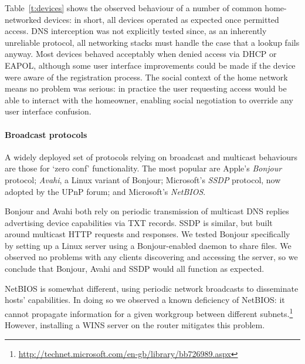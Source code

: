 Table~\ref{t:devices} shows the observed behaviour of a number of common
home-networked devices: in short, all devices operated as expected once
permitted access.  DNS interception was not explicitly tested since, as an
inherently unreliable protocol, all networking stacks must handle the case that
a lookup fails anyway.  Most devices behaved acceptably when denied access via
DHCP or EAPOL, although some user interface improvements could be made if the
device were aware of the registration process.  The social context of the home
network means no problem was serious: in practice the user requesting access
would be able to interact with the homeowner, enabling social negotiation to
override any user interface confusion. 


\paragraph{Broadcast protocols} A widely deployed set of protocols relying on
broadcast and multicast behaviours are those for `zero conf' functionality.  The
most popular are Apple's \emph{Bonjour} protocol; \emph{Avahi}, a Linux variant
of Bonjour; Microsoft's \emph{SSDP} protocol, now adopted by the UPnP forum; and
Microsoft's \emph{NetBIOS}.  

Bonjour and Avahi both rely on periodic transmission of multicast DNS replies
advertising device capabilities via TXT records.  SSDP is similar, but built
around multicast HTTP requests and responses.  We tested Bonjour specifically by
setting up a Linux server using a Bonjour-enabled daemon to share files.  We
observed no problems with any clients discovering and accessing the server, so
we conclude that Bonjour, Avahi and SSDP would all function as expected. 

NetBIOS is somewhat different, using periodic network broadcasts to disseminate
hosts' capabilities.  In doing so we observed a known deficiency of NetBIOS: it
cannot propagate information for a given workgroup between different
subnets.\footnote{\url{http://technet.microsoft.com/en-gb/library/bb726989.aspx}}
However, installing a WINS server on the router mitigates this problem.

